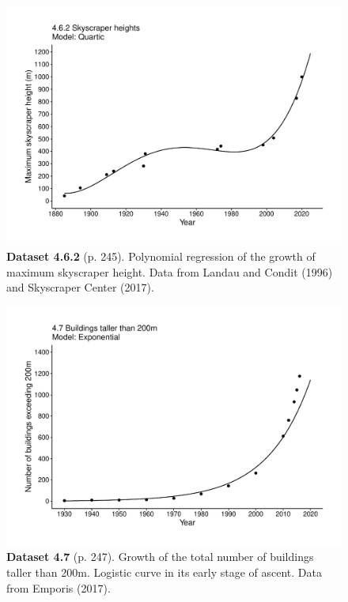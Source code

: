 \documentclass[aps,rmp,preprint,superscriptaddress,10pt,onecolumn]{article}
\begin{document}
\clearpage
\begin{figure}[h]
\includegraphics[width=\textwidth]{output/figs-ggplot/4.6.2.pdf}
\caption*{\textbf{Dataset 4.6.2} (p. 245). Polynomial regression of the growth of maximum skyscraper height. Data from Landau and Condit (1996) and Skyscraper Center (2017). }
\end{figure}
	
\clearpage
\begin{figure}[h]
\includegraphics[width=\textwidth]{output/figs-ggplot/4.7.pdf}
\caption*{\textbf{Dataset 4.7} (p. 247). Growth of the total number of buildings taller than 200m. Logistic curve in its early stage of ascent. Data from Emporis (2017).}
\end{figure}
	
\end{document}
